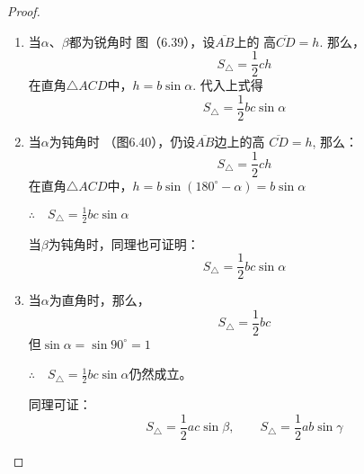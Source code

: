 \begin{proof}
\begin{enumerate}
    \item 当$\alpha$、$\beta$都为锐角时
图（6.39），设$\overline{AB}$上的
高$\overline{CD}=h$. 那么，
\[S_{\triangle}=\frac{1}{2}ch\]
在直角$\triangle ACD$中，$h=b\sin\alpha$. 
代入上式得
\[S_{\triangle}=\frac{1}{2}bc\sin\alpha\]

\begin{figure}[htp]\centering
    \begin{minipage}[t]{0.48\textwidth}
    \centering
{}
    \caption{}
    \end{minipage}
    \begin{minipage}[t]{0.48\textwidth}
    \centering
    \caption{}
    \end{minipage}
    \end{figure}

\item 当$\alpha$为钝角时
（图6.40），仍设$\overline{AB}$边上的高
$\overline{CD}=h$, 那么：
\[S_{\triangle}=\frac{1}{2}ch\]
在直角$\triangle ACD$中，$h=b\sin(180^{\circ}-\alpha)=b\sin\alpha$ 

$\therefore\quad S_{\triangle}=\frac{1}{2}bc\sin\alpha$

当$\beta$为钝角时，同理也可证明：
\[S_{\triangle}=\frac{1}{2}bc\sin\alpha\]
\item 当$\alpha$为直角时，那么，
\[S_{\triangle}=\frac{1}{2}bc \]
但$\sin\alpha=\sin 90^{\circ}=1$

$\therefore\quad S_{\triangle}=\frac{1}{2}bc\sin\alpha$仍然成立。

同理可证：
\[S_{\triangle}=\frac{1}{2} ac\sin\beta,\qquad 
S_{\triangle}=\frac{1}{2}ab\sin\gamma\]
\end{enumerate} 
\end{proof}


